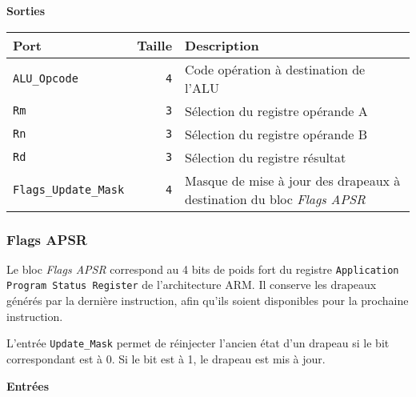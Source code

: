 \documentclass{article}
\begin{document}
    \vspace{1em}
    \textbf{Sorties}\\

    \begin{tabular}{|l|r|l|}
        \hline
        \textbf{Port}                & \textbf{Taille} & \textbf{Description}                                                         \\
        \hline

        \texttt{ALU\_Opcode}         & \texttt{4}      & Code opération à destination de l'ALU                                        \\
        \hline
        \texttt{Rm}                  & \texttt{3}      & Sélection du registre opérande A                                             \\
        \hline
        \texttt{Rn}                  & \texttt{3}      & Sélection du registre opérande B                                             \\
        \hline
        \texttt{Rd}                  & \texttt{3}      & Sélection du registre résultat                                               \\
        \hline
        \texttt{Flags\_Update\_Mask} & \texttt{4}      & Masque de mise à jour des drapeaux à destination du bloc \textit{Flags APSR} \\

        \hline
    \end{tabular}

    \subsubsection{Flags APSR}
    \label{sec:FlagsAPSR}


    Le bloc \textit{Flags APSR} correspond au 4 bits de poids fort du registre \texttt{Application Program Status Register} de l'architecture ARM. Il conserve les drapeaux générés par la dernière instruction, afin qu'ils soient disponibles pour la prochaine instruction.

    L'entrée \texttt{Update\_Mask} permet de réinjecter l'ancien état d'un drapeau si le bit correspondant est à 0.
    Si le bit est à 1, le drapeau est mis à jour.


    \textbf{Entrées}\\
\end{document}
